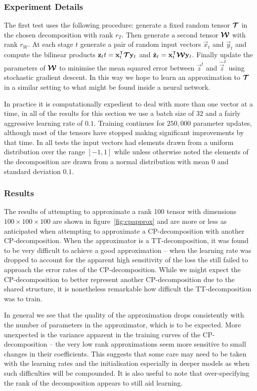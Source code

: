 \subsubsection{Experiment Details}
The first test uses the following procedure: generate a fixed random tensor \(\bm{\mathcal{T}}\)
in the chosen decomposition with rank \(r_T\). Then generate a second tensor \(\bm{\mathcal{W}}\) 
with rank \(r_W\). At each stage \(t\) generate a pair of random input vectors \(\vec{x}_t\) and
\(\vec{y}_t\) and compute the bilinear products 
\(\mathbf{z}_tt = \mathbf{x}_t^\mathsf{T}\bm{\mathcal{T}}\mathbf{y}_t\) and 
\(\hat{\mathbf{z}}_t = \mathbf{x}_t^\mathsf{T}\bm{\mathcal{W}}\mathbf{y}_t\). Finally update the parameters of
\(\bm{\mathcal{W}}\) to minimise the mean squared error between \(\vec{z}^t\) and \(\hat{\vec{z}}^t\)
using stochastic gradient descent. In this way we hope to learn an approximation to 
\(\bm{\mathcal{T}}\) in a similar setting to what might be found inside a neural network.

In practice it is computationally expedient to deal with more than one vector at a time, in
all of the results for this section we use a batch size of \(32\) and a fairly aggressive
 learning rate of \(0.1\).
Training continues for \(250,000\) parameter updates, although most of the tensors have stopped
making significant improvements by that time. In all tests the input vectors had elements drawn
from a uniform distribution over the range \([-1,1]\) while unless otherwise noted the elements of
the decomposition are drawn from a normal distribution with mean \(0\) and standard deviation
\(0.1\).

\subsubsection{Results}
The results of attempting to approximate a rank 100 tensor with dimensions 
\(100 \times 100 \times 100\) are shown in figure~\ref{fig:cpapprox} and are more or less
as anticipated when attempting to approximate a CP-decomposition with another CP-decomposition.
When the approximator is a TT-decomposition, it was found to be very difficult to achieve a
good approximation -- when the learning rate was dropped to account for the apparent high
sensitivity of the loss the still failed to approach the error rates of the CP-decomposition.
While we might expect the CP-decomposition to better represent another CP-decomposition due to
the shared structure, it is nonetheless remarkable how difficult the TT-decomposition was to
train.

In general we see that the quality of the approximation drops consistently with the
number of parameters in the approximator, which is to be expected. 
More unexpected is the variance apparent in the training
curves of the CP-decomposition -- the very low rank approximations seem more sensitive to small
 changes in their coefficients. This suggests that some care
may need to be taken with the learning rates and the initialisation especially in deeper models as
when such difficulties will be compounded.
It is also useful to note that over-specifying the rank of the decomposition
appears to still aid learning.

